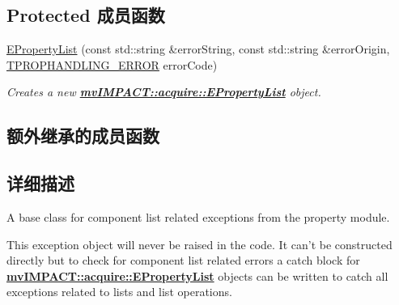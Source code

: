 \subsection*{Protected 成员函数}
\begin{DoxyCompactItemize}
\item 
\hyperlink{classmv_i_m_p_a_c_t_1_1acquire_1_1_e_property_list_aa055a35666b9ee37d0c8ccc09fa647ed}{E\+Property\+List} (const std\+::string \&error\+String, const std\+::string \&error\+Origin, \hyperlink{group___common_interface_ga61b0634ab285d9a2a303e0092167127e}{T\+P\+R\+O\+P\+H\+A\+N\+D\+L\+I\+N\+G\+\_\+\+E\+R\+R\+O\+R} error\+Code)
\begin{DoxyCompactList}\small\item\em Creates a new {\bfseries \hyperlink{classmv_i_m_p_a_c_t_1_1acquire_1_1_e_property_list}{mv\+I\+M\+P\+A\+C\+T\+::acquire\+::\+E\+Property\+List}} object. \end{DoxyCompactList}\end{DoxyCompactItemize}
\subsection*{额外继承的成员函数}


\subsection{详细描述}
A base class for component list related exceptions from the property module. 

This exception object will never be raised in the code. It can't be constructed directly but to check for component list related errors a catch block for {\bfseries \hyperlink{classmv_i_m_p_a_c_t_1_1acquire_1_1_e_property_list}{mv\+I\+M\+P\+A\+C\+T\+::acquire\+::\+E\+Property\+List}} objects can be written to catch all exceptions related to lists and list operations. 

